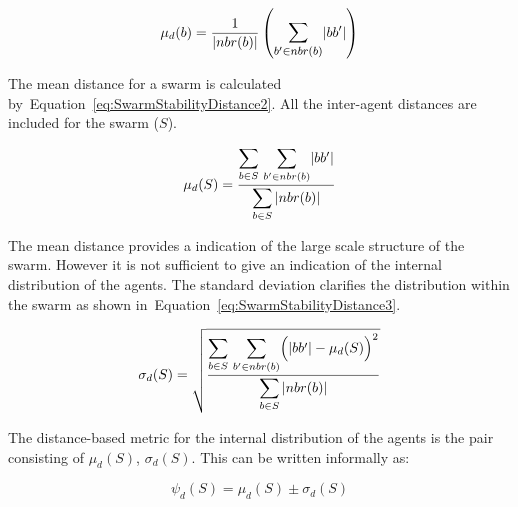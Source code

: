 \documentclass{ieeeaccess}
\begin{document}
\begin{equation}
\label{eq:SwarmStabilityDistance1}
\mu_d(b) = \frac{1}{\mathlarger{|nbr(b)|}}\left({\mathlarger{\sum_{b' \in nbr(b)}}|bb'|}\right)
\end{equation}

The mean distance for a swarm is calculated by~Equation~\ref{eq:SwarmStabilityDistance2}. All the inter-agent distances are included for the swarm ($S$). 


\begin{equation}
\label{eq:SwarmStabilityDistance2}
\mu_d(S) = \frac{\mathlarger{\sum_{b \in S}}~\mathlarger{\sum_{b' \in nbr(b)}}|bb'|}{\mathlarger{\sum_{b \in S}|nbr(b)|}}
\end{equation}

The mean distance provides a indication of the large scale structure of the swarm. However it is not sufficient to give an indication of the internal distribution of the agents. The standard deviation clarifies the distribution within the swarm as shown in~Equation~\ref{eq:SwarmStabilityDistance3}. 


\begin{equation}
\label{eq:SwarmStabilityDistance3}
\sigma_d(S) = \sqrt{\frac{\mathlarger{\sum_{b \in S}}~\mathlarger{\sum_{b' \in nbr(b)}}\Big(|bb'| - \mu_d(S)\Big)^2}{\mathlarger{\sum_{b \in S}|nbr(b)|}}}
\end{equation}

The distance-based metric for the internal distribution of the agents is the pair consisting of $\mu_d(S)$, $\sigma_d(S)$. This can be written informally as:

\begin{equation}
\label{eq:SwarmDistanceMetric}
\psi_d(S) = \mu_d(S)\pm \sigma_d(S)
\end{equation}
\end{document}

